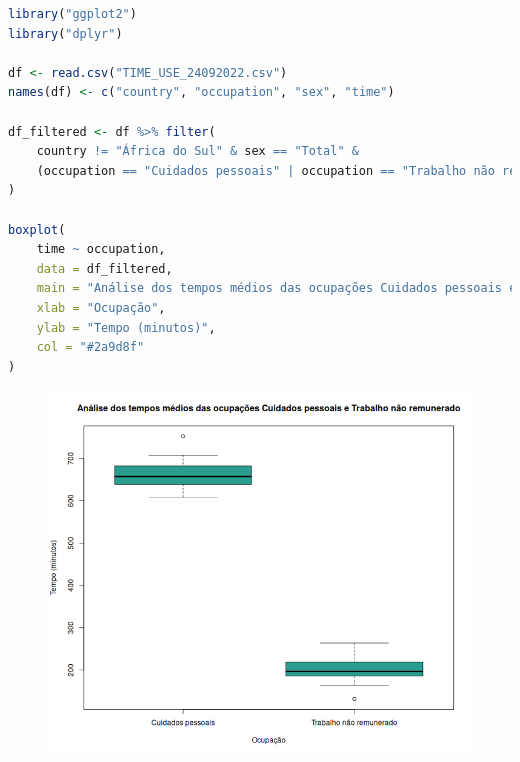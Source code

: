 \documentclass[12pt,a4paper]{article}
\begin{document}
\begin{lstlisting}[language=R]
library("ggplot2")
library("dplyr")

df <- read.csv("TIME_USE_24092022.csv")
names(df) <- c("country", "occupation", "sex", "time")

df_filtered <- df %>% filter(
    country != "África do Sul" & sex == "Total" &
    (occupation == "Cuidados pessoais" | occupation == "Trabalho não remunerado")
)

boxplot(
    time ~ occupation,
    data = df_filtered,
    main = "Análise dos tempos médios das ocupações Cuidados pessoais e Trabalho não remunerado",
    xlab = "Ocupação",
    ylab = "Tempo (minutos)",
    col = "#2a9d8f"
)
\end{lstlisting}

\qquad

\begin{figure}[h]
  \centering
  \includegraphics[scale = 0.6]{./ex02.png}
\end{figure}
\end{document}
